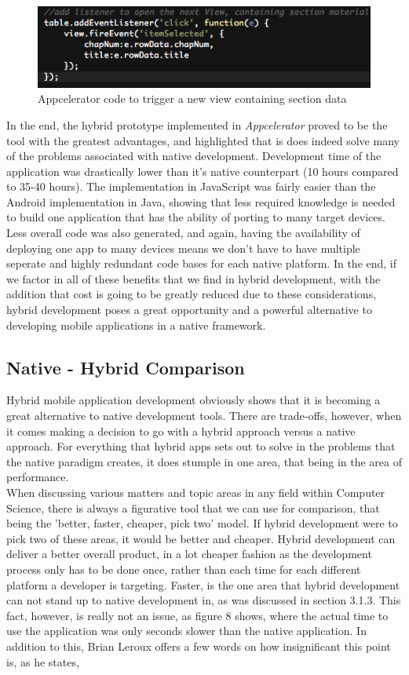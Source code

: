 \documentclass[11pt, twocolumn]{article}
\begin{document}
\begin{figure}[h]
\includegraphics[scale=0.6]{appcelerator-code}
\caption{Appcelerator code to trigger a new view containing section data ~\cite{Poulsen2012}}
\end{figure}

In the end, the hybrid prototype implemented in {\it Appcelerator} proved to be the tool with the greatest advantages, and highlighted that is does indeed solve many of the problems associated with native development.  Development time of the application was drastically lower than it's native counterpart (10 hours compared to 35-40 hours). The implementation in JavaScript was fairly easier than the Android implementation in Java, showing that less required knowledge is needed to build one application that has the ability of porting to many target devices.  Less overall code was also generated, and again, having the availability of deploying one app to many devices means we don't have to have multiple seperate and highly redundant code bases for each native platform.  In the end, if we factor in all of these benefits that we find in hybrid development, with the addition that cost is going to be greatly reduced due to these considerations, hybrid development poses a great opportunity and a powerful alternative to developing mobile applications in a native framework.

\subsection{Native - Hybrid Comparison}
Hybrid mobile application development obviously shows that it is becoming a great alternative to native development tools.  There are trade-offs, however, when it comes making a decision to go with a hybrid approach versus a native approach.  For everything that hybrid apps sets out to solve in the problems that the native paradigm creates, it does stumple in one area, that being in the area of performance.\\

When discussing various matters and topic areas in any field within Computer Science, there is always a figurative tool that we can use for comparison, that being the 'better, faster, cheaper, pick two' model.  If hybrid development were to pick two of these areas, it would be better and cheaper.  Hybrid development can deliver a better overall product, in a lot cheaper fashion as the development process only has to be done once, rather than each time for each different platform a developer is targeting.  Faster, is the one area that hybrid development can not stand up to native development in, as was discussed in section 3.1.3.  This fact, however, is really not an issue, as figure 8 shows, where the actual time to use the application was only seconds slower than the native application.  In addition to this, Brian Leroux offers a few words on how insignificant this point is, as he states,
\end{document}
